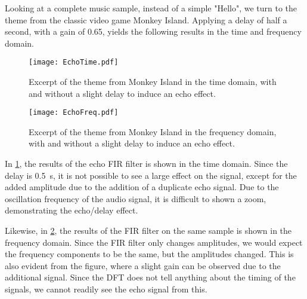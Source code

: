 Looking at a complete music sample, instead of a simple "Hello", we turn to the theme from the classic video game Monkey Island. Applying a delay of half a second, with a gain of \num{0.65}, yields the following results in the time and frequency domain.

\begin{figure}[!hbt]
	\centering
	\texttt{[image: EchoTime.pdf]}
	\caption{Excerpt of the theme from Monkey Island in the time domain, with and without a slight delay to induce an echo effect.}
	\label{fig:echotime}
\end{figure}

\begin{figure}[!hbt]
	\centering
	\texttt{[image: EchoFreq.pdf]}
	\caption{Excerpt of the theme from Monkey Island in the frequency domain, with and without a slight delay to induce an echo effect.}
	\label{fig:echofreq}
\end{figure}

In \cref{fig:echotime}, the results of the echo FIR filter is shown in the time domain. Since the delay is \SI{0.5}{\second}, it is not possible to see a large effect on the signal, except for the added amplitude due to the addition of a duplicate echo signal. Due to the oscillation frequency of the audio signal, it is difficult to shown a zoom, demonstrating the echo/delay effect.

Likewise, in \cref{fig:echofreq}, the results of the FIR filter on the same sample is shown in the frequency domain. Since the FIR filter only changes amplitudes, we would expect the frequency components to be the same, but the amplitudes changed. This is also evident from the figure, where a slight gain can be observed due to the additional signal. Since the DFT does not tell anything about the timing of the signals, we cannot readily see the echo signal from this.
